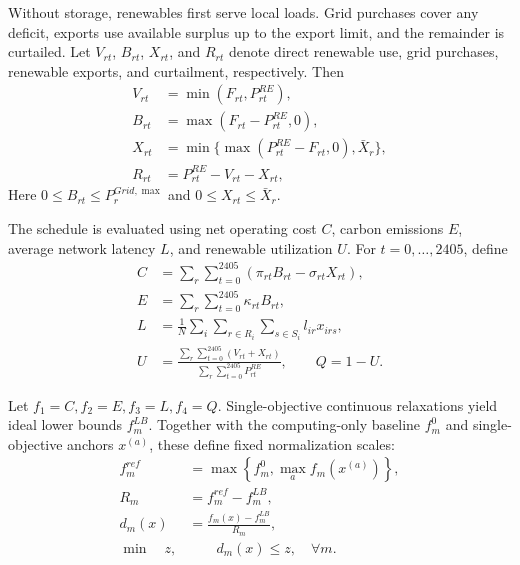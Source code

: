 Without storage, renewables first serve local loads. Grid purchases cover any deficit, exports use available surplus up to the export limit, and the remainder is curtailed.
Let $V_{rt}$, $B_{rt}$, $X_{rt}$, and $R_{rt}$ denote
direct renewable use, grid purchases, renewable exports, and curtailment, respectively. Then
\begin{equation}
	\begin{aligned}
		V_{rt}&=\min(F_{rt},P^{RE}_{rt}),\\
		B_{rt}&=\max(F_{rt}-P^{RE}_{rt},0),\\
		X_{rt}&=\min\{\max(P^{RE}_{rt}-F_{rt},0),\bar X_r\},\\
		R_{rt}&=P^{RE}_{rt}-V_{rt}-X_{rt},
	\end{aligned}
	\label{eq:q2_energy}
\end{equation}
Here $0\leq B_{rt}\leq P_r^{Grid,\max}$ and $0\leq X_{rt}\leq\bar X_r$.

The schedule is evaluated using net operating cost $C$, carbon emissions $E$, average network latency $L$,
and renewable utilization $U$.
For $t=0,\ldots,2405$, define
\begin{equation}
	\begin{aligned}
		C
		&=
		\sum_r\sum_{t=0}^{2405}
		\left(\pi_{rt}B_{rt}-\sigma_{rt}X_{rt}\right),\\
		E
		&=
		\sum_r\sum_{t=0}^{2405}\kappa_{rt}B_{rt},\\
		L
		&=
		\frac{1}{N}
		\sum_i\sum_{r\in R_i}\sum_{s\in S_i}
		l_{ir}x_{irs},\\
		U
		&=
		\frac{\displaystyle
			\sum_r\sum_{t=0}^{2405}(V_{rt}+X_{rt})}
		{\displaystyle
			\sum_r\sum_{t=0}^{2405}P^{RE}_{rt}},
		\qquad Q=1-U.
	\end{aligned}
	\label{eq:q2_objectives}
\end{equation}

Let $f_1=C,f_2=E,f_3=L,f_4=Q$. Single-objective continuous relaxations yield ideal lower bounds $f_m^{LB}$. Together with the computing-only baseline $f_m^0$ and single-objective anchors $x^{(a)}$, these define fixed normalization scales:
\begin{equation}
	\begin{aligned}
		f_m^{ref}
		&=
		\max\left\{
		f_m^0,\max_a f_m(x^{(a)})
		\right\},\\
		R_m
		&=
		f_m^{ref}-f_m^{LB},\\
		d_m(x)
		&=
		\frac{f_m(x)-f_m^{LB}}{R_m},\\
		\min\quad z,
		&\qquad d_m(x)\leq z,\quad \forall m .
	\end{aligned}
	\label{eq:q2_minmax}
\end{equation}

